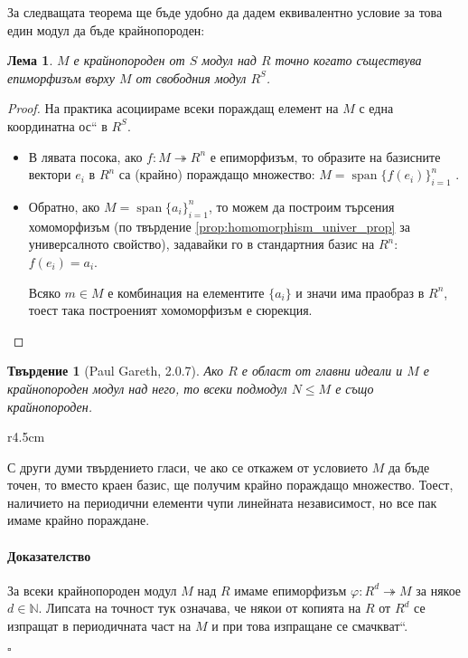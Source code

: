 \documentclass{article}
\newif\ifusemulticols
\theoremstyle{definition}
\theoremstyle{remark}
\theoremstyle{plain}
\theoremstyle{plain}
\newtheorem{prop}[theorem]{Твърдение}
\newtheorem{lemma}[theorem]{Лема}
\newenvironment{mymulticols}
    { \ifusemulticols \begin{multicols}{2} \fi }
    { \ifusemulticols \end{multicols} \fi }
\newenvironment{myproof}{\paragraph{Доказателство}}{\hfill$\square$}
\DeclareMathOperator{\vecspan}{span}
\newcommand{\N}{\mathbb{N}}
\begin{document}
\begin{mymulticols}
За следващата теорема ще бъде удобно да дадем еквивалентно условие за това един модул да бъде
крайнопороден:

\begin{lemma}
    $M$ е крайнопороден от $S$ модул над $R$ точно когато съществува епиморфизъм върху $M$ от свободния
    модул $R^{S}$.
\end{lemma}
\begin{proof}
    На практика асоциираме всеки пораждащ елемент на $M$ с една \quotedblbase координатна ос`` в
    $R^{S}$.

    \begin{itemize}
        \item В лявата посока, ако $f : M \twoheadrightarrow R^n$ е епиморфизъм, то образите на
            базисните вектори $e_i$ в $R^n$ са (крайно) пораждащо множество: $M = \vecspan \{ f(e_i) \}_{i=1}^n$ .

        \item Обратно, ако $M = \vecspan \{ a_i \}_{i=1}^n$, то можем да построим търсения
            хомоморфизъм (по твърдение \ref{prop:homomorphism_univer_prop} за универсалното
            свойство), задавайки го в стандартния базис на $R^n$: $f(e_i) = a_i$.

            Всяко $m \in M$ е комбинация на елементите $\{ a_i \}$ и значи има праобраз в $R^n$,
            тоест така построеният хомоморфизъм е сюрекция.
    \end{itemize}

\end{proof}

\begin{prop}[Paul Gareth, 2.0.7]
    \label{prop:finitely_generated_rank}
    Ако $R$ е област от главни идеали и $M$ е крайнопороден модул над него, то всеки подмодул $N \le
    M$ е също крайнопороден.
\end{prop}

\begin{wrapfigure}[13]{r}{4.5cm}
\end{wrapfigure}

С други думи твърдението гласи, че ако се откажем от условието $M$ да бъде точен, то вместо краен
базис, ще получим крайно пораждащо множество.
Тоест, наличието на периодични елементи чупи линейната независимост, но все пак имаме крайно
пораждане.

\begin{myproof}
    За всеки крайнопороден модул $M$ над $R$ имаме епиморфизъм $\varphi : R^d \twoheadrightarrow M$
    за някое $d \in \N$.  Липсата на точност тук означава, че някои от копията на $R$ от $R^d$ се
    изпращат в периодичната част на $M$ и при това изпращане се \quotedblbase смачкват``.


\end{myproof}
\end{mymulticols}
\end{document}
